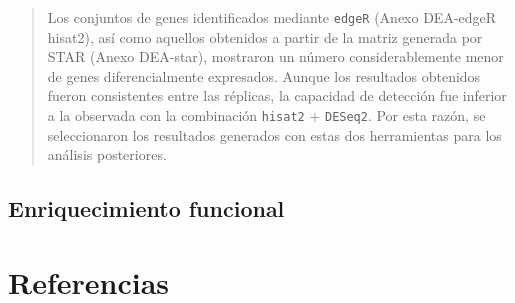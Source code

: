 \documentclass[
  10pt,
]{article}
\begin{document}
\begin{quote}
Los conjuntos de genes identificados mediante \texttt{edgeR} (Anexo
DEA-edgeR hisat2), así como aquellos obtenidos a partir de la matriz
generada por STAR (Anexo DEA-star), mostraron un número
considerablemente menor de genes diferencialmente expresados. Aunque los
resultados obtenidos fueron consistentes entre las réplicas, la
capacidad de detección fue inferior a la observada con la combinación
\texttt{hisat2} + \texttt{DESeq2}. Por esta razón, se seleccionaron los
resultados generados con estas dos herramientas para los análisis
posteriores.
\end{quote}

\subsection{Enriquecimiento funcional}\label{enriquecimiento-funcional}

\section{Referencias}\label{referencias}
\end{document}

